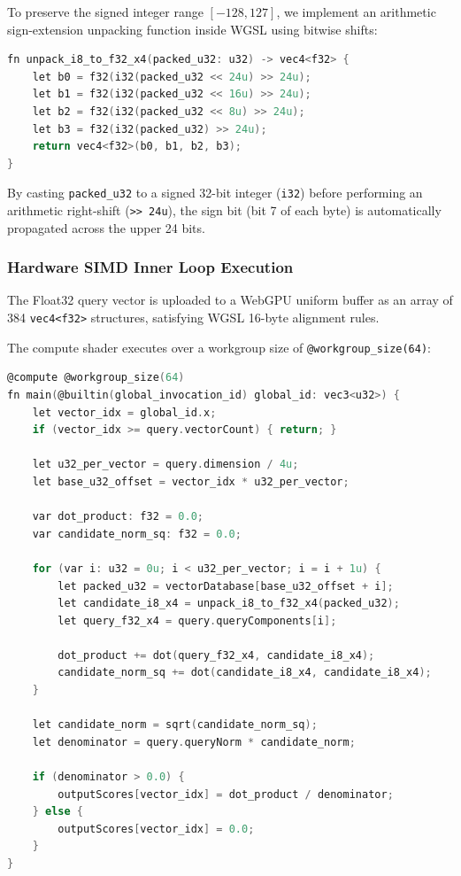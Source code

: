 \documentclass[fleqn,10pt,lineno]{wlpeerj}
\begin{document}
To preserve the signed integer range $[-128, 127]$, we implement an arithmetic sign-extension unpacking function inside WGSL using bitwise shifts:
\begin{lstlisting}[language=C, caption={WGSL Int8 Arithmetic Sign-Extension Bit Unpacking}, label={lst:unpack}]
fn unpack_i8_to_f32_x4(packed_u32: u32) -> vec4<f32> {
    let b0 = f32(i32(packed_u32 << 24u) >> 24u);
    let b1 = f32(i32(packed_u32 << 16u) >> 24u);
    let b2 = f32(i32(packed_u32 << 8u) >> 24u);
    let b3 = f32(i32(packed_u32) >> 24u);
    return vec4<f32>(b0, b1, b2, b3);
}
\end{lstlisting}

By casting \texttt{packed\_u32} to a signed 32-bit integer (\texttt{i32}) before performing an arithmetic right-shift (\texttt{>> 24u}), the sign bit (bit 7 of each byte) is automatically propagated across the upper 24 bits.

\subsubsection*{Hardware SIMD Inner Loop Execution}
The Float32 query vector is uploaded to a WebGPU uniform buffer as an array of 384 \texttt{vec4<f32>} structures, satisfying WGSL 16-byte alignment rules.

The compute shader executes over a workgroup size of \texttt{@workgroup\_size(64)}:
\begin{lstlisting}[language=C, caption={WebGPU Parallel Cosine Similarity Compute Kernel}, label={lst:kernel}]
@compute @workgroup_size(64)
fn main(@builtin(global_invocation_id) global_id: vec3<u32>) {
    let vector_idx = global_id.x;
    if (vector_idx >= query.vectorCount) { return; }

    let u32_per_vector = query.dimension / 4u;
    let base_u32_offset = vector_idx * u32_per_vector;

    var dot_product: f32 = 0.0;
    var candidate_norm_sq: f32 = 0.0;

    for (var i: u32 = 0u; i < u32_per_vector; i = i + 1u) {
        let packed_u32 = vectorDatabase[base_u32_offset + i];
        let candidate_i8_x4 = unpack_i8_to_f32_x4(packed_u32);
        let query_f32_x4 = query.queryComponents[i];

        dot_product += dot(query_f32_x4, candidate_i8_x4);
        candidate_norm_sq += dot(candidate_i8_x4, candidate_i8_x4);
    }

    let candidate_norm = sqrt(candidate_norm_sq);
    let denominator = query.queryNorm * candidate_norm;

    if (denominator > 0.0) {
        outputScores[vector_idx] = dot_product / denominator;
    } else {
        outputScores[vector_idx] = 0.0;
    }
}
\end{lstlisting}
\end{document}
